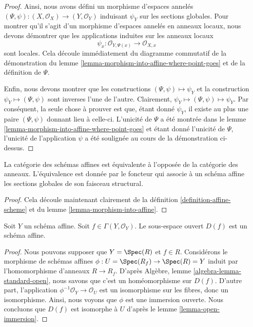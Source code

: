 \begin{proof}
\medskip\noindent
Ainsi, nous avons défini un morphisme d'espaces annelés $(\Psi,
\psi) : (X, \mathcal{O}_X) \to (Y, \mathcal{O}_Y)$ induisant $\psi_Y$
sur les sections globales. Pour montrer qu'il s'agit d'un morphisme
d'espaces annelés en anneaux locaux, nous devons démontrer que les
applications induites sur les anneaux locaux
$$
\psi_x : \mathcal{O}_{Y, \Psi(x)} \longrightarrow \mathcal{O}_{X, x}
$$
sont locales. Cela découle immédiatement du diagramme commutatif de
la démonstration du lemme \ref{lemma-morphism-into-affine-where-point-goes}
et de la définition de $\Psi$.

\medskip\noindent
Enfin, nous devons montrer que les constructions
$(\Psi, \psi) \mapsto \psi_Y$ et la construction $\psi_Y
\mapsto (\Psi, \psi)$ sont inverses l'une de l'autre. Clairement,
$\psi_Y \mapsto (\Psi, \psi) \mapsto \psi_Y$. Par conséquent,
la seule chose à prouver est que, étant donné $\psi_Y$,
il existe au plus une paire $(\Psi, \psi)$ donnant
lieu à celle-ci. L'unicité de $\Psi$ a été montrée dans
le lemme \ref{lemma-morphism-into-affine-where-point-goes}
et étant donné l'unicité de $\Psi$, l'unicité de l'application
$\psi$ a été soulignée au cours de la démonstration
ci-dessus.
\end{proof}

\begin{lemma}
\label{lemma-category-affine-schemes}
La catégorie des schémas affines est équivalente à l'opposée de la
catégorie des anneaux. L'équivalence est donnée par le foncteur qui associe à un
schéma affine les sections globales de son faisceau structural.
\end{lemma}

\begin{proof}
Cela découle maintenant clairement de la définition \ref{definition-affine-scheme}
et du lemme \ref{lemma-morphism-into-affine}.
\end{proof}

\begin{lemma}
\label{lemma-standard-open-affine}
Soit $Y$ un schéma affine. Soit
$f \in \Gamma(Y, \mathcal{O}_Y)$. Le
sous-espace ouvert $D(f)$ est un schéma affine.
\end{lemma}

\begin{proof}
Nous pouvons supposer que $Y = \Spec(R)$ et $f \in R$.
Considérons le morphisme de schémas affines
$\phi : U = \Spec(R_f) \to \Spec(R) = Y$ induit par l'homomorphisme
d'anneaux $R \to R_f$. D'après Algèbre, lemme \ref{algebra-lemma-standard-open},
nous savons que c'est un homéomorphisme sur $D(f)$.
D'autre part, l'application $\phi^{-1}\mathcal{O}_Y \to \mathcal{O}_U$ est un
isomorphisme sur les fibres, donc un isomorphisme. Ainsi, nous voyons
que $\phi$ est une immersion ouverte. Nous concluons que $D(f)$
est isomorphe à $U$ d'après le lemme \ref{lemma-open-immersion}.
\end{proof}

